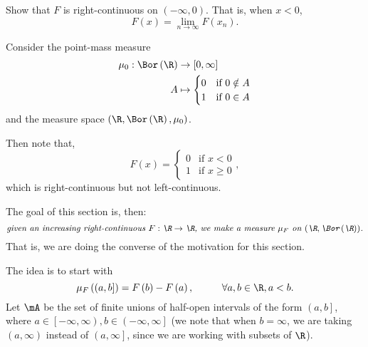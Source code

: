 \documentclass[pmath451]{subfiles}
\begin{document}
    \begin{exercise}{}
        Show that $F$ is right-continuous on $\left( -\infty,0 \right)$. That is, when $x < 0$,
        \begin{equation*}
            F\left( x \right) = \lim_{n\to\infty} F\left( x_n \right).
        \end{equation*}
    \end{exercise}

    \rruleline

    \begin{example}{}
        Consider the point-mass measure
        \begin{equation*}
            \begin{aligned}
                \mu_0 : \Bor\left( \R \right) & \to \left[ 0,\infty \right] \\
                A & \mapsto
                \begin{cases} 
                    0 & \text{if $0\notin A$} \\
                    1 & \text{if $0\in A$}
                \end{cases}
            \end{aligned} 
        \end{equation*}
        and the measure space $\left( \R,\Bor\left( \R \right),\mu_0 \right)$.

        Then note that,
        \begin{equation*}
            F\left( x \right) =
            \begin{cases} 
                0 & \text{if $x<0$} \\
                1 & \text{if $x\geq 0$}
            \end{cases},
        \end{equation*}
        which is right-continuous but not left-continuous.
    \end{example}
    
    \rruleline

    \np The goal of this section is, then:
    \begin{equation*}
        \text{\textit{given an increasing right-continuous $F:\R\to\R$, we make a measure $\mu_F$ on $\left( \R,\Bor\left( \R \right) \right)$.}}
    \end{equation*}
    That is, we are doing the converse of the motivation for this section.

    The idea is to start with
    \begin{equation*}
        \mu_F\left( \left( a,b \right] \right) = F\left( b \right) - F\left( a \right),\hspace{1cm}\forall a,b\in\R, a<b.
    \end{equation*}
    Let $\mA$ be the set of finite unions of half-open intervals of the form $\left( a,b \right]$, where $a\in\left[ -\infty,\infty \right),b\in\left( -\infty,\infty \right]$ (we note that when $b=\infty$, we are taking $\left( a,\infty \right)$ instead of $\left( a,\infty \right]$, since we are working with subsets of $\R$).
\end{document}
